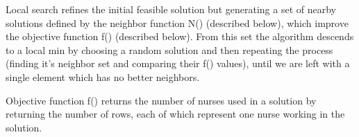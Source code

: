 \documentclass[11pt]{article}
\begin{document}
Local search refines the initial feasible solution but generating a set of nearby solutions defined by the
neighbor function N() (described below), which improve the objective function f() (described below). From this set the algorithm descends to a local min by choosing a random
solution and then repeating the process (finding it's neighbor set and comparing their f() values), until we are left with a single element which has
no better neighbors.\\


Objective function f() returns the number of nurses used in a solution by returning the number of rows, each of
which represent one nurse working in the solution.\\

\end{document}
